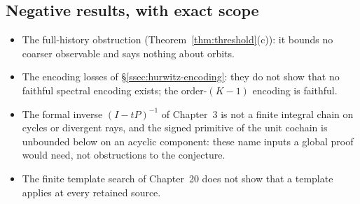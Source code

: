 \subsection{Negative results, with exact scope}

\begin{itemize}
\item The full-history obstruction (Theorem~\ref{thm:threshold}(c)): it bounds no coarser observable and says nothing about orbits.
\item The encoding losses of §\ref{ssec:hurwitz-encoding}: they do not show that no faithful spectral encoding exists; the order-$(K-1)$ encoding is faithful.
\item The formal inverse $(I-tP)^{-1}$ of Chapter~3 is not a finite integral chain on cycles or divergent rays, and the signed primitive of the unit cochain is unbounded below on an acyclic component: these name inputs a global proof would need, not obstructions to the conjecture.
\item The finite template search of Chapter~20 does not show that a template applies at every retained source.
\end{itemize}
